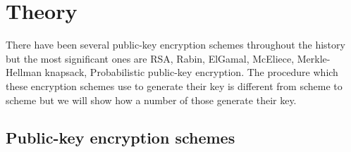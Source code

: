 \documentclass{acm_proc_article-sp}
\begin{document}
\section{Theory}
There have been several public-key encryption schemes throughout the history but the most significant ones are RSA, Rabin, ElGamal, McEliece, Merkle-Hellman knapsack, Probabilistic public-key encryption. The procedure which these encryption schemes use to generate their key is different from scheme to scheme but we will show how a number of those generate their key.
\subsection{Public-key encryption schemes}
\end{document}
